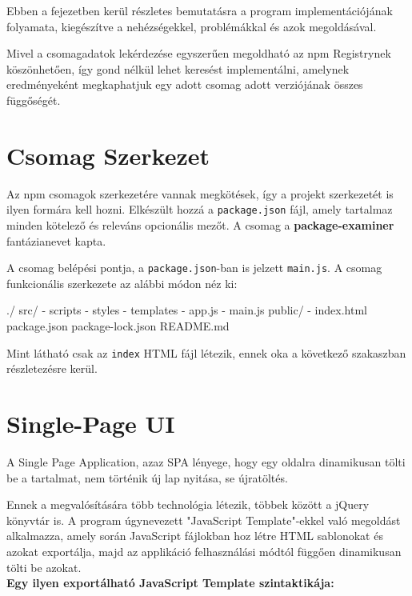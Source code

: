 
Ebben a fejezetben kerül részletes bemutatásra a program implementációjának folyamata, kiegészítve a nehézségekkel, problémákkal és azok megoldásával. 

Mivel a csomagadatok lekérdezése egyszerűen megoldható az npm Registrynek köszönhetően, így gond nélkül lehet keresést implementálni, amelynek eredményeként megkaphatjuk egy adott csomag adott verziójának összes függőségét.

\section{Csomag Szerkezet}
Az npm csomagok szerkezetére vannak megkötések, így a projekt szerkezetét is ilyen formára kell hozni. Elkészült hozzá a \texttt{package.json} fájl, amely tartalmaz minden kötelező és releváns opcionális mezőt. A csomag a \textbf{package-examiner} fantázianevet kapta.   

A csomag belépési pontja, a \texttt{package.json}-ban is jelzett \texttt{main.js}. A csomag funkcionális szerkezete az alábbi módon néz ki:

\begin{js}
./	
	src/
		- scripts
		- styles
		- templates
		- app.js
		- main.js
	public/
		- index.html
	package.json
	package-lock.json
	README.md	
\end{js}

Mint látható csak az \texttt{index} HTML fájl létezik, ennek oka a következő szakaszban részletezésre kerül.

\pagebreak

\section{Single-Page UI}

A Single Page Application, azaz SPA lényege, hogy egy oldalra dinamikusan tölti be a tartalmat, nem történik új lap nyitása, se újratöltés.

Ennek a megvalósítására több technológia létezik, többek között a jQuery könyvtár is. A program úgynevezett "JavaScript Template"-ekkel való megoldást alkalmazza, amely során JavaScript fájlokban hoz létre HTML sablonokat és azokat exportálja, majd az applikáció felhasználási módtól függően dinamikusan tölti be azokat.\\

\textbf{Egy ilyen exportálható JavaScript Template szintaktikája:}

